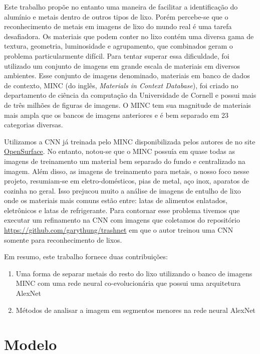 \documentclass[conference, compsoc, 12pt]{IEEEtran}
\begin{document}
Este trabalho propõe no entanto uma maneira de facilitar a identificação do alumínio e metais dentro de outros tipos de lixo. Porém percebe-se que o reconhecimento de metais em imagens de lixo do mundo real é uma tarefa desafiadora. Os materiais que podem conter no lixo contém uma diversa gama de textura, geometria, luminosidade e agrupamento, que combinados geram o problema particularmente difícil. Para tentar superar essa dificuldade, foi utilizado um conjunto de imagens em grande escala de materiais em diversos ambientes. Esse conjunto de imagens denominado, materiais em banco de dados de contexto, MINC (do inglês, \textit{Materials in Context Database}), foi criado no departamento de ciência da computação da Universidade de Cornell e possui mais de três milhões de figuras de imagens. O MINC tem sua magnitude de materiais mais ampla que os bancos de imagens anteriores e é bem separado em 23 categorias diversas.

Utilizamos a CNN já treinada pelo MINC disponibilizada pelos autores de \cite{Artigo principal} no site \href{http://opensurfaces.cs.cornell.edu/publications/minc/>}{OpenSurface}. No entanto, notou-se que o MINC possuía em quase todas as imagens de treinamento um material bem separado do fundo e centralizado na imagem. Além disso, as imagens de treinamento para metais, o nosso foco nesse projeto, resumiam-se em eletro-domésticos, pias de metal, aço inox, aparatos de cozinha no geral. Isso prejucou muito a análise de imagens de entulho de lixo onde os materiais mais comuns estão entre: latas de alimentos enlatados, eletrônicos e latas de refrigerante. Para contornar esse problema tivemos que executar um refinamento na CNN com imagens que coletamos do repositório \href{https://github.com/garythung/trashnet}{https://github.com/garythung/trashnet} em que o autor treinou uma CNN somente para reconhecimento de lixos.

Em resumo, este trabalho fornece duas contribuições:

\begin{enumerate}
    \item Uma forma de separar metais do resto do lixo utilizando o banco de imagens MINC com uma rede neural co-evolucionária que possui uma arquitetura AlexNet
    \item Métodos de analisar a imagem em segmentos menores na rede neural AlexNet
\end{enumerate}


\section{Modelo}
\end{document}
